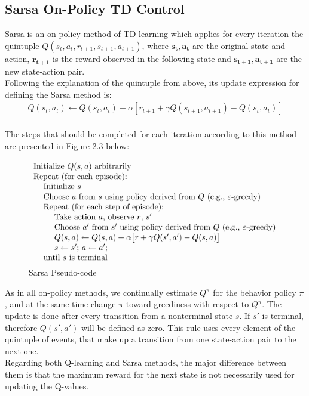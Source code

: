 \documentclass[paper=a4, fontsize=11pt]{scrartcl}
\numberwithin{equation}{section}		%
\numberwithin{figure}{section}			%
\numberwithin{table}{section}				%
\begin{document}
\subsection*{Sarsa On-Policy TD Control}
Sarsa is an on-policy method of TD learning which applies for every iteration the quintuple $Q(s_t, a_t, r_{t+1}, s_{t+1}, a_{t+1})$, where  $\mathbf{s_t, a_t}$ are the original state and action, $\mathbf{r_{t+1}}$ is the reward observed in the following state and $\mathbf{s_{t+1}, a_{t+1}}$ are the new state-action pair.\\
Following the explanation of the quintuple from above, its update expression for defining the Sarsa method is:
\begin{align}
Q(s_t, a_t) \gets Q(s_t, a_t)+\alpha[r_{t+1}+\gamma Q(s_{t+1}, a_{t+1})-Q(s_t, a_t)]
\end{align}\\
The steps that should be completed for each iteration according to this method are presented in Figure 2.3 below:
\begin{figure}[H] \centering
\includegraphics[scale=0.6]{sarsa_algorithm.png}
\caption{Sarsa Pseudo-code} \label{figure:Sarsa}
\end{figure}
As in all on-policy methods, we continually estimate $Q^\pi$ for the behavior policy $\pi$, and at the same time change $\pi$ toward greediness with respect to $Q^\pi$. The update is done after every transition from a nonterminal state $s$. If $s'$ is terminal, therefore $Q(s',a')$ will be defined as zero. This rule uses every element of the quintuple of events, that make up a transition from one state-action pair to the next one.\\
Regarding both Q-learning and Sarsa methods, the major difference between them is that the maximum reward for the next state is not necessarily used for updating the Q-values.
\end{document}

